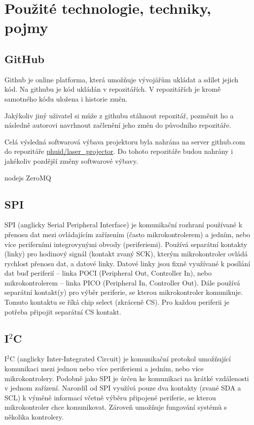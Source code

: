 \chapter{Použité technologie, techniky, pojmy}
\section{GitHub}
Github je online platforma, která umožňuje vývojářům ukládat a sdílet jejich kód. Na githubu je kód ukládán v repozitářích. V repozitářích je kromě samotného kódu uložena i historie změn.

Jakýkoliv jiný uživatel si může z githubu stáhnout repozitář, pozměnit ho a následně autorovi navrhnout začlenění jeho změn do původního repozitáře.

Celá výsledná softwarová výbava projektoru byla nahrána na server github.com do repozitáře \href{https://github.com/phuid/laser_projector}{phuid/laser\_projector}. Do tohoto repozitáře budou nahrány i jakékoliv pozdější změny softwarové výbavy.

nodejs
ZeroMQ

\section{SPI}\label{sec:spi}
SPI (anglicky Serial Peripheral Interface) je komunikační rozhraní používané k přenosu dat mezi ovládajícím zařízením (často mikrokontrolerem) a jedním, nebo více periferními integrovynými obvody (periferiemi).
Používá separátní kontakty (linky) pro hodinový signál (kontakt zvaný SCK), kterým mikrokontroler ovládá rychlost přenosu dat, a datové linky.
Datové linky jsou fixně využívané k posílání dat buď periferií -- linka POCI (Peripheral Out, Controller In), nebo mikrokontrolerem -- linka PICO (Peripheral In, Controller Out).
Dále používá separátní kontakt(y) pro výběr periferie, se kterou mikrokontroler komunikuje. Tomuto kontaktu se říká chip select (zkráceně CS). Pro každou periferii je potřeba připojit separátní CS kontakt.~\cite{sparkfun-spi}

\section{I$^{2}$C}
I$^{2}$C (anglicky Inter-Integrated Circuit) je komunikační protokol umožňující komunikaci mezi jednou nebo více periferiemi a jedním, nebo více mikrokontrolery.
Podobně jako SPI je úrčen ke komunikaci na krátké vzdálenosti v jednom zařízení.
Narozdíl od SPI využívá pouze dva kontakty (zvané SDA a SCL) k výměně informací včetně výběru připojené periferie, se kterou mikrokontroler chce komunikovat.
Zároveň umožňuje fungování systémů s několika kontrolery.~\cite{sparkfun-i2c}

